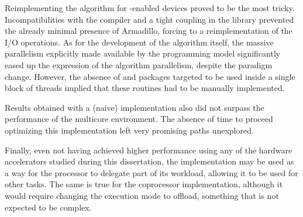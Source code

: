 \documentclass[../thesis]{subfiles}
\begin{document}
	Reimplementing the algorithm for \cuda-enabled devices proved to be the most tricky. Incompatibilities with the compiler and a tight coupling in the library prevented the already minimal presence of Armadillo, forcing to a reimplementation of the I/O operations. As for the development of the algorithm itself, the massive parallelism explicitly made available by the \cuda programming model significantly eased up the expression of the algorithm parallelism, despite the paradigm change. However, the absence of \blas and \lapack packages targeted to be used inside a single block of threads implied that these routines had to be manually implemented.

	Results obtained with a (naive) \cuda implementation also did not surpass the performance of the multicore environment. The absence of time to proceed optimizing this implementation left very promising paths unexplored.

	Finally, even not having achieved higher performance using any of the hardware accelerators studied during this dissertation, the \cuda implementation may be used as a way for the processor to delegate part of its workload, allowing it to be used for other tasks. The same is true for the coprocessor implementation, although it would require changing the execution mode to offload, something that is not expected to be complex.

	
\end{document}
